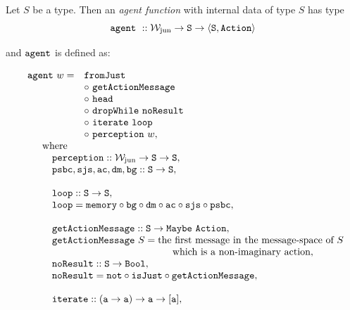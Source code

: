 \begin{definition}
	Let $S$ be a type. Then an \emph{agent function} with internal data of type $S$ has type
	$$
		\mathtt{agent}\ :: \mathtt{\mathcal{W}_{\mathrm{jun}} \rightarrow S \rightarrow \langle S, Action \rangle}
	$$
	
	and $\mathtt{agent}$ is defined as:
	
	$$
		\begin{array}{l}
			\begin{array}{l l}
				\field{agent}\ w = & \field{fromJust}\\
								   & \circ\ \field{getActionMessage}\\
								   & \circ\ \field{head}\\
								   & \circ\ \field{dropWhile}\ \field{noResult}\\
								   & \circ\ \field{iterate}\ \field{loop}\\
								   & \circ\ \field{perception}\ w,\\
			\end{array}\\
			\quad \quad \mt{where}\\
			\quad \quad \quad \field{perception} :: \type{\wjun \rightarrow S \rightarrow S},\\
			\quad \quad \quad \field{psbc}, \field{sjs}, \field{ac}, \field{dm}, \field{bg} :: \type{S \rightarrow S},\\
			\\
			\quad \quad \quad \field{loop} :: \type{S \rightarrow S},\\
			\quad \quad \quad \field{loop} = \field{memory} \circ \field{bg} \circ \field{dm} \circ \field{ac} \circ \field{sjs} \circ \field{psbc},\\
			\\
			\quad \quad \quad \field{getActionMessage} :: \type{S \rightarrow Maybe\ Action},\\
			\quad \quad \quad \field{getActionMessage}\ S = \textnormal{the first message in the message-space of $S$}\\ \hspace{5.35cm} \textnormal{which is a non-imaginary action},\\
			\quad \quad \quad \field{noResult} :: \type{S \rightarrow Bool},\\
			\quad \quad \quad \field{noResult} = \field{not} \circ \field{isJust} \circ \field{getActionMessage},\\
			\\
			\quad \quad \quad \field{iterate} :: \type{(a \rightarrow a) \rightarrow a \rightarrow [a]},\\

\end{array}$$
\end{definition}
